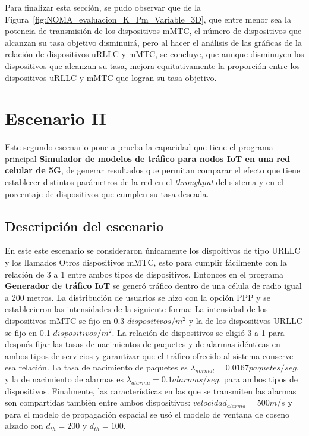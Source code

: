 Para finalizar esta sección, se pudo observar que de la Figura~\ref{fig:NOMA_evaluacion_K_Pm_Variable_3D}, que entre menor sea la potencia de transmisión de los dispositivos mMTC, el número de dispositivos que alcanzan su tasa objetivo disminuirá, pero al hacer el análisis de las gráficas de la relación de dispositivos uRLLC y mMTC, se concluye, que aunque disminuyen los dispositivos que alcanzan su tasa, mejora equitativamente la proporción entre los dispositivos uRLLC y mMTC que logran su tasa objetivo.

\break

\section{Escenario II} %

Este segundo escenario pone a prueba la capacidad que tiene el programa principal \textbf{Simulador de modelos de tráfico para nodos IoT en una red celular de 5G}, de generar resultados que permitan comparar el efecto que tiene establecer distintos parámetros de la red en el \textit{throughput} del sistema y en el porcentaje de dispositivos que cumplen su tasa deseada. \newline

\subsection{Descripción del escenario}

En este este escenario se consideraron únicamente los dispoitivos de tipo URLLC y los llamados Otros dispositivos mMTC, esto para cumplir fácilmente con la relación de 3 a 1 entre ambos tipos de dispositivos. Entonces en el programa \textbf{Generador de tráfico IoT} se generó tráfico dentro de una célula de radio igual a 200 metros. La distribución de usuarios se hizo con la opción PPP y se establecieron las intensidades de la siguiente forma: La intensidad de los dispositivos mMTC se fijo en 0.3 $dispositivos/m^2$ y la de los dispositivos URLLC se fijo en 0.1 $dispositivos/m^2$. La relación de dispositivos se eligió 3 a 1 para después fijar las tasas de nacimientos de paquetes y de alarmas idénticas en ambos tipos de servicios y garantizar que el tráfico ofrecido al sistema conserve esa relación. La tasa de nacimiento de paquetes es $\lambda_{normal} = 0.0167 paquetes/seg.$ y la de nacimiento de alarmas es $\lambda_{alarma} = 0.1 alarmas/seg.$ para ambos tipos de dispositivos. Finalmente, las características en las que se transmiten las alarmas son compartidas también entre ambos dispositivos: $velocidad_{alarma} = 500 m/s$ y para el modelo de propagación espacial se usó el modelo de ventana de coseno alzado con $d_{th}=200$ y $d_{th}=100$. \newline

